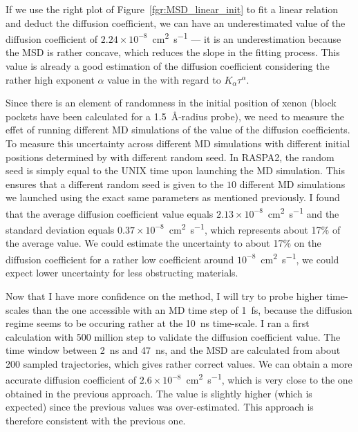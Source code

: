 \documentclass[main]{subfiles}
\begin{document}
If we use the right plot of Figure~\ref{fgr:MSD_linear_init} to fit a linear relation and deduct the diffusion coefficient, we can have an underestimated value of the diffusion coefficient of $2.24\times 10^{-8}$~\si{\square\cm\per\s} --- it is an underestimation because the MSD is rather concave, which reduces the slope in the fitting process. This value is already a good estimation of the diffusion coefficient considering the rather high exponent $\alpha$ value in the with regard to $K_\alpha\tau^\alpha$.

Since there is an element of randomness in the initial position of xenon (block pockets have been calculated for a \SI{1.5}{\angstrom}-radius probe), we need to measure the effet of running different MD simulations of the value of the diffusion coefficients. To measure this uncertainty across different MD simulations with different initial positions determined by with different random seed. In RASPA2, the random seed is simply equal to the UNIX time upon launching the MD simulation. This ensures that a different random seed is given to the $10$ different MD simulations we launched using the exact same parameters as mentioned previously. I found that the average diffusion coefficient value equals $2.13\times 10^{-8}$~\si{\square\cm\per\s} and the standard deviation equals $0.37\times 10^{-8}$~\si{\square\cm\per\s}, which represents about {17\%} of the average value. We could estimate the uncertainty to about {17\%} on the diffusion coefficient for a rather low coefficient around $10^{-8}$~\si{\square\cm\per\s}, we could expect lower uncertainty for less obstructing materials. 

Now that I have more confidence on the method, I will try to probe higher time-scales than the one accessible with an MD time step of \SI{1}{\fs}, because the diffusion regime seems to be occuring rather at the \SI{10}{\ns} time-scale. I ran a first calculation with 500 million step to validate the diffusion coefficient value. The time window between \SI{2}{\ns} and \SI{47}{\ns}, and the MSD are calculated from about 200 sampled trajectories, which gives rather correct values. We can obtain a more accurate diffusion coefficient of $2.6\times 10^{-8}$~\si{\square\cm\per\s}, which is very close to the one obtained in the previous approach. The value is slightly higher (which is expected) since the previous values was over-estimated. This approach is therefore consistent with the previous one.
\end{document}
